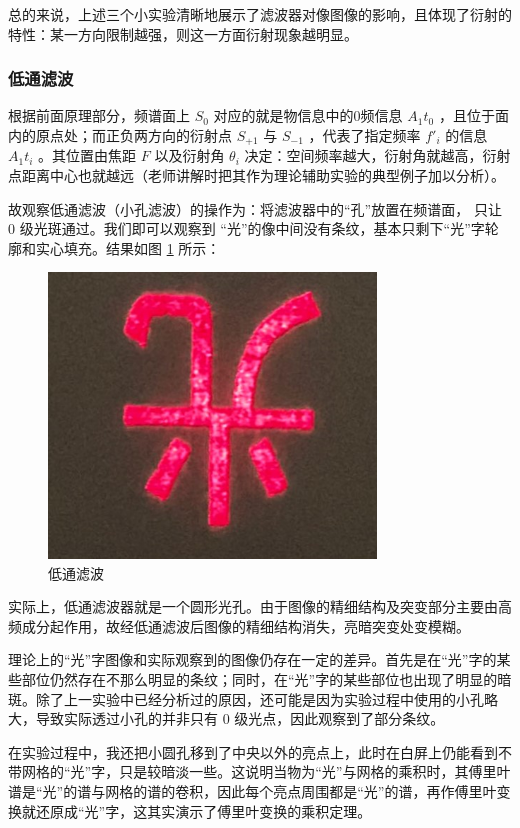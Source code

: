 \documentclass[UTF8]{article}
\theoremstyle{MyLineTheoremStyle} %
\theoremstyle{MyBlockTheoremStyle} %
\theoremstyle{MySubsubsectionStyle} %
\begin{document}
总的来说，上述三个小实验清晰地展示了滤波器对像图像的影响，且体现了衍射的特性：某一方向限制越强，则这一方面衍射现象越明显。


\subsubsection{低通滤波}

根据前面原理部分，频谱面上 $S_0$ 对应的就是物信息中的0频信息 $A_1t_0$ ，且位于面内的原点处；而正负两方向的衍射点 $S_{+1}$ 与 $S_{-1}$ ，代表了指定频率 $f'_i$ 的信息 $A_1t_i$ 。其位置由焦距 $F$ 以及衍射角 $\theta_i$ 决定：空间频率越大，衍射角就越高，衍射点距离中心也就越远（老师讲解时把其作为理论辅助实验的典型例子加以分析）。

故观察低通滤波（小孔滤波）的操作为：将滤波器中的“孔”放置在频谱面，
只让 0 级光斑通过。我们即可以观察到 “光”的像中间没有条纹，基本只剩下“光”字轮廓和实心填充。结果如图 \ref{低通滤波} 所示：

\begin{figure}[H]\centering
    \includegraphics[height=215pt]{assets/1 阿贝尔/光 低通.jpg}
    \caption{低通滤波}\label{低通滤波}
\end{figure}

实际上，低通滤波器就是一个圆形光孔。由于图像的精细结构及突变部分主要由高频成分起作用，故经低通滤波后图像的精细结构消失，亮暗突变处变模糊。

理论上的“光”字图像和实际观察到的图像仍存在一定的差异。首先是在“光”字的某些部位仍然存在不那么明显的条纹；同时，在“光”字的某些部位也出现了明显的暗斑。除了上一实验中已经分析过的原因，还可能是因为实验过程中使用的小孔略大，导致实际透过小孔的并非只有 0 级光点，因此观察到了部分条纹。

在实验过程中，我还把小圆孔移到了中央以外的亮点上，此时在白屏上仍能看到不带网格的“光”字，只是较暗淡一些。这说明当物为“光”与网格的乘积时，其傅里叶谱是“光”的谱与网格的谱的卷积，因此每个亮点周围都是“光”的谱，再作傅里叶变换就还原成“光”字，这其实演示了傅里叶变换的乘积定理。
\end{document}
